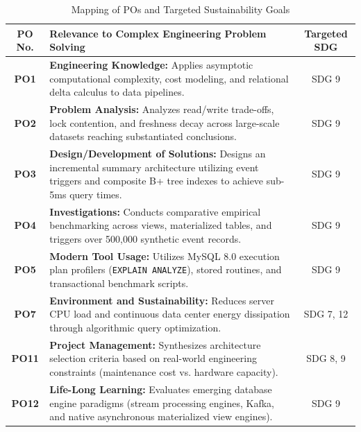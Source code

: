 \documentclass[11pt,a4paper]{report}
\begin{document}
\begin{table}[h!]
    \centering
    \renewcommand{\arraystretch}{1.3}
    \setlength{\tabcolsep}{7pt}
    \caption{Mapping of POs and Targeted Sustainability Goals}
    \label{tab:po_mapping}
    \begin{tabular}{|c|p{8.5cm}|c|}
        \hline
        \textbf{PO No.} & \textbf{Relevance to Complex Engineering Problem Solving} & \textbf{Targeted SDG} \\
        \hline
        \textbf{PO1} & \textbf{Engineering Knowledge:} Applies asymptotic computational complexity, cost modeling, and relational delta calculus to data pipelines. & SDG 9 \\
        \hline
        \textbf{PO2} & \textbf{Problem Analysis:} Analyzes read/write trade-offs, lock contention, and freshness decay across large-scale datasets reaching substantiated conclusions. & SDG 9 \\
        \hline
        \textbf{PO3} & \textbf{Design/Development of Solutions:} Designs an incremental summary architecture utilizing event triggers and composite B+ tree indexes to achieve sub-5ms query times. & SDG 9 \\
        \hline
        \textbf{PO4} & \textbf{Investigations:} Conducts comparative empirical benchmarking across views, materialized tables, and triggers over 500,000 synthetic event records. & SDG 9 \\
        \hline
        \textbf{PO5} & \textbf{Modern Tool Usage:} Utilizes MySQL 8.0 execution plan profilers (\texttt{EXPLAIN ANALYZE}), stored routines, and transactional benchmark scripts. & SDG 9 \\
        \hline
        \textbf{PO7} & \textbf{Environment and Sustainability:} Reduces server CPU load and continuous data center energy dissipation through algorithmic query optimization. & SDG 7, 12 \\
        \hline
        \textbf{PO11} & \textbf{Project Management:} Synthesizes architecture selection criteria based on real-world engineering constraints (maintenance cost vs. hardware capacity). & SDG 8, 9 \\
        \hline
        \textbf{PO12} & \textbf{Life-Long Learning:} Evaluates emerging database engine paradigms (stream processing engines, Kafka, and native asynchronous materialized view engines). & SDG 9 \\
        \hline
    \end{tabular}
\end{table}
\end{document}
